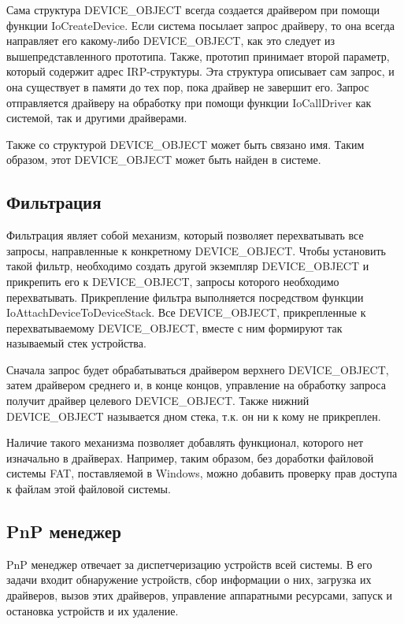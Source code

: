 \documentclass[14pt,a4paper]{article}
\begin{document}
\par Сама структура DEVICE\_OBJECT всегда создается драйвером при помощи функции IoCreateDevice. Если система посылает запрос драйверу, то она всегда направляет его какому-либо DEVICE\_OBJECT, как это следует из вышепредставленного прототипа. Также, прототип принимает второй параметр, который содержит адрес IRP-структуры. Эта структура описывает сам запрос, и она существует в памяти до тех пор, пока драйвер не завершит его. Запрос отправляется драйверу на обработку при помощи функции IoCallDriver как системой, так и другими драйверами. \\

\par Также со структурой DEVICE\_OBJECT может быть связано имя. Таким образом, этот DEVICE\_OBJECT может быть найден в системе.\\

\subsection{Фильтрация}
Фильтрация являет собой механизм, который позволяет перехватывать все запросы, направленные к конкретному DEVICE\_OBJECT. Чтобы установить такой фильтр, необходимо создать другой экземпляр DEVICE\_OBJECT и прикрепить его к DEVICE\_OBJECT, запросы которого необходимо перехватывать. Прикрепление фильтра выполняется посредством функции IoAttachDeviceToDeviceStack. Все DEVICE\_OBJECT, прикрепленные к перехватываемому DEVICE\_OBJECT, вместе с ним формируют так называемый стек устройства.

\par Сначала запрос будет обрабатываться драйвером верхнего DEVICE\_OBJECT, затем драйвером среднего и, в конце концов, управление на обработку запроса получит драйвер целевого DEVICE\_OBJECT. Также нижний DEVICE\_OBJECT называется дном стека, т.к. он ни к кому не прикреплен. \\

\par Наличие такого механизма позволяет добавлять функционал, которого нет изначально в драйверах. Например, таким образом, без доработки файловой системы FAT, поставляемой в Windows, можно добавить проверку прав доступа к файлам этой файловой системы.\\

\subsection{PnP менеджер}
PnP менеджер отвечает за диспетчеризацию устройств всей системы. В его задачи входит обнаружение устройств, сбор информации о них, загрузка их драйверов, вызов этих драйверов, управление аппаратными ресурсами, запуск и остановка устройств и их удаление.\\
\end{document}
